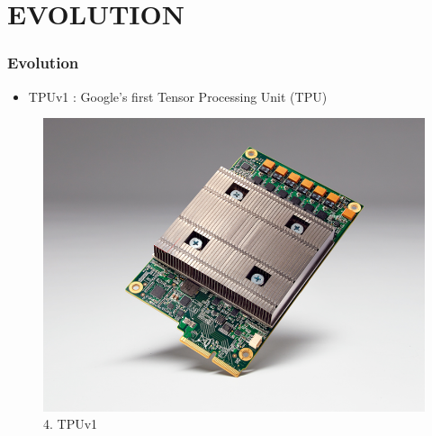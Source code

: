 \documentclass[c]{beamer}
\begin{document}
\section{EVOLUTION}
	\begin{frame} [c]
		\frametitle{Evolution}
        \begin{itemize}
        \justifying
              \item \large TPUv1 : Google’s first Tensor Processing Unit (TPU)
           \end{itemize} 
           \begin{figure}
            \centering
            \includegraphics[scale=.38]{images/4tpu.png}
            \caption{4. TPUv1}
            \label{fig:TPUv1}
        \end{figure}
	\end{frame}
        
\end{document}
